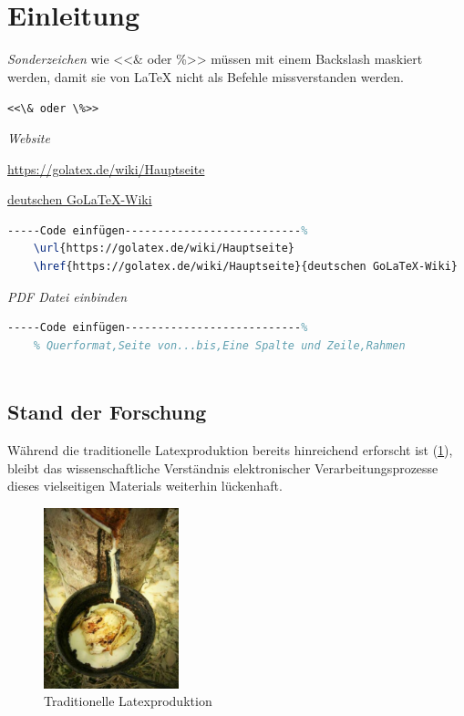 \section*{Einleitung}

\emph{Sonderzeichen}  wie <<\& oder \%>> müssen mit einem Backslash maskiert werden, damit sie von LaTeX nicht als Befehle missverstanden werden.

\verb|<<\& oder \%>>| 

\emph{Website}

\url{https://golatex.de/wiki/Hauptseite} 

\href{https://golatex.de/wiki/Hauptseite}{deutschen GoLaTeX-Wiki}
\begin{lstlisting}[language=TeX,% C, TeX, Bash, Python
]-----Code einfügen---------------------------%
	\url{https://golatex.de/wiki/Hauptseite}
	\href{https://golatex.de/wiki/Hauptseite}{deutschen GoLaTeX-Wiki}
\end{lstlisting} 

\emph{PDF Datei einbinden}
\begin{lstlisting}[language=TeX,% C, TeX, Bash, Python
]-----Code einfügen---------------------------%
	% Querformat,Seite von...bis,Eine Spalte und Zeile,Rahmen
	
\end{lstlisting}



\clearpage
\subsection*{Stand der Forschung}

Während die traditionelle Latexproduktion bereits hinreichend erforscht ist (\ref{fig:latex}), bleibt das wissenschaftliche Verständnis elektronischer Verarbeitungsprozesse dieses vielseitigen Materials weiterhin lückenhaft. 


\begin{figure}[hb]
	\centering
	\includegraphics[width=0.35\textwidth]{images/Test2-latex-001.pdf}
	\caption{Traditionelle Latexproduktion}\label{fig:latex}%
\end{figure}


